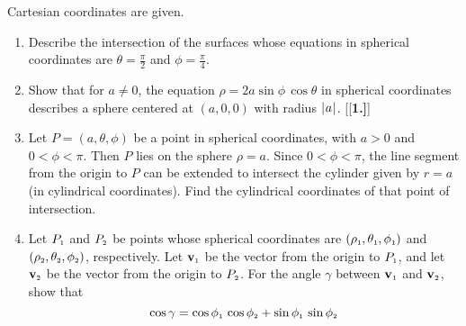 Cartesian coordinates are given.
\begin{enumerate}[\bfseries 1.]
\par\noindent For Exercises 5--7, write the given equation in (a) cylindrical and (b) spherical coordinates.
[{[\bfseries 1.]}]
\vspace{1mm}
[{[\bfseries 1.]}]
 \item Describe the intersection of the surfaces whose equations in spherical coordinates are $\theta = \frac{\pi}{2}$
  and $\phi = \frac{\pi}{4}$.
 \item Show that for $a \ne 0$, the equation $\rho = 2a \sin \phi \, \cos \theta$ in spherical coordinates describes a
  sphere centered at $(a,0,0)$ with radius $\lvert\mspace{1mu}a\mspace{1mu}\rvert$.
[{[\bfseries 1.]}]
 \item Let $P = (a,\theta,\phi)$ be a point in spherical coordinates, with $a > 0$ and $0 < \phi < \pi$. Then $P$ lies
  on the sphere $\rho = a$. Since $0 < \phi < \pi$, the line segment from the origin to $P$
  can be extended to intersect the cylinder given by $r = a$ (in cylindrical coordinates). Find the cylindrical
  coordinates of that point of intersection.
 \item Let $P_{\scriptscriptstyle 1}$ and $P_{\scriptscriptstyle 2}$ be points whose spherical coordinates are
  $( \rho_{\scriptscriptstyle 1},\theta_{\scriptscriptstyle 1},\phi_{\scriptscriptstyle 1} )$ and $( \rho_{\scriptscriptstyle 2},\theta_{\scriptscriptstyle 2},\phi_{\scriptscriptstyle 2} )$,
  respectively. Let $\textbf{v}_{\scriptscriptstyle 1}$ be the vector from the origin to $P_{\scriptscriptstyle 1}$, and let
  $\textbf{v}_{\scriptscriptstyle 2}$ be the vector from the origin to $P_{\scriptscriptstyle 2}$. For the angle $\gamma$ between
  $\textbf{v}_{\scriptscriptstyle 1}$ and $\textbf{v}_{\scriptscriptstyle 2}$, show that
  \begin{displaymath}
   \cos \gamma = \cos \ssub{\phi}{1} \, \cos \ssub{\phi}{2} + \sin \ssub{\phi}{1} \, \sin \ssub{\phi}{2} \,

\end{displaymath}
\end{enumerate}
